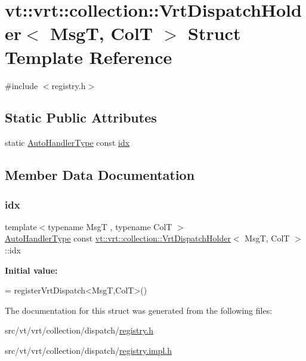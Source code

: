 \hypertarget{structvt_1_1vrt_1_1collection_1_1_vrt_dispatch_holder}{}\section{vt\+:\+:vrt\+:\+:collection\+:\+:Vrt\+Dispatch\+Holder$<$ MsgT, ColT $>$ Struct Template Reference}
\label{structvt_1_1vrt_1_1collection_1_1_vrt_dispatch_holder}


{\ttfamily \#include $<$registry.\+h$>$}

\subsection*{Static Public Attributes}
\begin{DoxyCompactItemize}
\item 
static \hyperlink{namespacevt_1_1vrt_1_1collection_af50831782f9d77f86d626f858f295c37}{Auto\+Handler\+Type} const \hyperlink{structvt_1_1vrt_1_1collection_1_1_vrt_dispatch_holder_abec6d8f18a8d9aed96a2f9f6df70a587}{idx}
\end{DoxyCompactItemize}


\subsection{Member Data Documentation}
\mbox{\label{structvt_1_1vrt_1_1collection_1_1_vrt_dispatch_holder_abec6d8f18a8d9aed96a2f9f6df70a587}} 
\subsubsection{\texorpdfstring{idx}{idx}}
{\footnotesize\ttfamily template$<$typename MsgT , typename ColT $>$ \\
\hyperlink{namespacevt_1_1vrt_1_1collection_af50831782f9d77f86d626f858f295c37}{Auto\+Handler\+Type} const \hyperlink{structvt_1_1vrt_1_1collection_1_1_vrt_dispatch_holder}{vt\+::vrt\+::collection\+::\+Vrt\+Dispatch\+Holder}$<$ MsgT, ColT $>$\+::idx\hspace{0.3cm}{\ttfamily [static]}}

{\bfseries Initial value\+:}
\begin{DoxyCode}
=
  registerVrtDispatch<MsgT,ColT>()
\end{DoxyCode}


The documentation for this struct was generated from the following files\+:\begin{DoxyCompactItemize}
\item 
src/vt/vrt/collection/dispatch/\hyperlink{vrt_2collection_2dispatch_2registry_8h}{registry.\+h}\item 
src/vt/vrt/collection/dispatch/\hyperlink{vrt_2collection_2dispatch_2registry_8impl_8h}{registry.\+impl.\+h}\end{DoxyCompactItemize}
